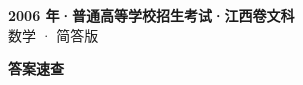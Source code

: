 \documentclass[zihao=-4, a4paper]{ctexart}
\begin{document}
\begin{center}
  {\Large\bfseries 2006 年·普通高等学校招生考试·江西卷文科}\\[4pt]
  {\large 数学 · 简答版}
\end{center}
\medskip
{}

\clearpage
{}
\begin{center}{\Large\bfseries 答案速查}\end{center}
\medskip

\end{document}
